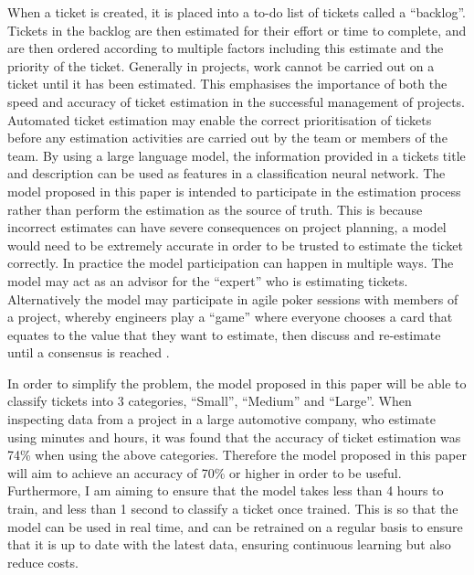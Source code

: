 \documentclass{UoYCSproject}
\begin{document}
    When a ticket is created, it is placed into a to-do list of tickets called a “backlog”.
    Tickets in the backlog are then estimated for their effort or time to complete, and are then ordered according to multiple factors including this estimate and the priority of the ticket.
    Generally in projects, work cannot be carried out on a ticket until it has been estimated.
    This emphasises the importance of both the speed and accuracy of ticket estimation in the successful management of projects.
    Automated ticket estimation may enable the correct prioritisation of tickets before any estimation activities are carried out by the team or members of the team.
    By using a large language model, the information provided in a tickets title and description can be used as features in a classification neural network.
    The model proposed in this paper is intended to participate in the estimation process rather than perform the estimation as the source of truth.
    This is because incorrect estimates can have severe consequences on project planning, a model would need to be extremely accurate in order to be trusted to estimate the ticket correctly.
    In practice the model participation can happen in multiple ways.
    The model may act as an advisor for the “expert” who is estimating tickets.
    Alternatively the model may participate in agile poker sessions with members of a project, whereby engineers play a “game” where everyone chooses a card that equates to the value that they want to estimate, then discuss and re-estimate until a consensus is reached \cite{1667560}. \par

    In order to simplify the problem, the model proposed in this paper will be able to classify tickets into 3 categories, “Small”, “Medium” and “Large”.
    When inspecting data from a project in a large automotive company, who estimate using minutes and hours, it was found that the accuracy of ticket estimation was 74\% when using the above categories.
    Therefore the model proposed in this paper will aim to achieve an accuracy of 70\% or higher in order to be useful.
    Furthermore, I am aiming to ensure that the model takes less than 4 hours to train, and less than 1 second to classify a ticket once trained.
    This is so that the model can be used in real time, and can be retrained on a regular basis to ensure that it is up to date with the latest data, ensuring continuous learning but also reduce costs. \par
\end{document}

